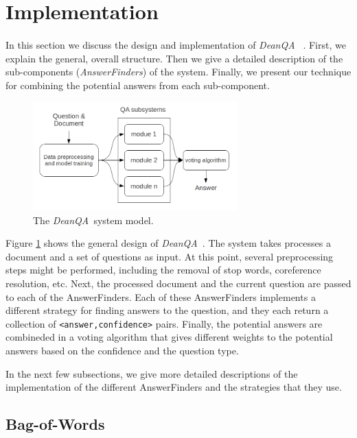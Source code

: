\documentclass[11pt,letterpaper]{article}
\newcommand{\name}{\emph{DeanQA~}}
\begin{document}
\section{Implementation}
\label{sec:implementation}
\paragraph{}
In this section we discuss the design and implementation of \name
. First, we explain the general, overall structure. Then we give
a detailed description of the sub-components (\emph{AnswerFinders}) of
the system. Finally, we present our technique for combining the
potential answers from each sub-component.

\begin{figure} 
	\centering
	\includegraphics[width=0.7\textwidth]{model.png}
	\caption{The \name system model.}
	\label{fig:model}
\end{figure}

Figure \ref{fig:model} shows the general design of \name.
The system takes processes a document and a set of questions as input.
At this point, several preprocessing steps might be performed,
including the removal of stop words, coreference resolution, etc.
Next, the processed document and the current question are passed to
each of the AnswerFinders. Each of these AnswerFinders implements a
different strategy for finding answers to the question, and they
each return a collection of \texttt{<answer,confidence>} pairs.
Finally, the potential answers are combineded in a voting algorithm
that gives different weights to the potential answers based on the
confidence and the question type.

In the next few subsections, we give more detailed descriptions of
the implementation of the different AnswerFinders and the
strategies that they use.

\subsection{Bag-of-Words}
\end{document}
